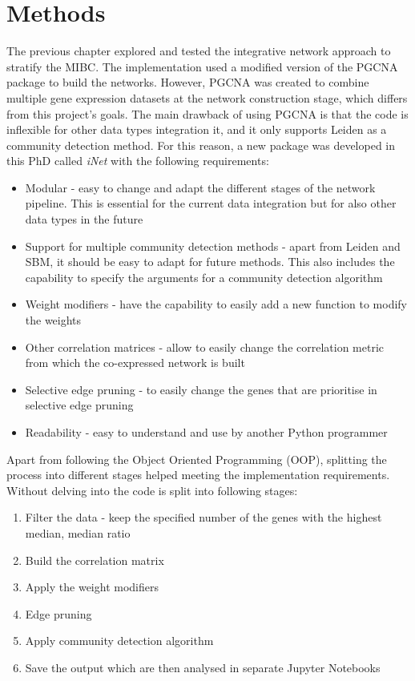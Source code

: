 \section{Methods} \label{s:N_II:methods}

The previous chapter explored and tested the integrative network approach to stratify the MIBC. The implementation used a modified version of the PGCNA package to build the networks. However, PGCNA was created to combine multiple gene expression datasets at the network construction stage, which differs from this project's goals. The main drawback of using PGCNA is that the code is inflexible for other data types integration it, and it only supports Leiden as a community detection method. For this reason, a new package was developed in this PhD called \textit{iNet} with the following requirements: 

\begin{itemize}
    \item Modular - easy to change and adapt the different stages of the network pipeline. This  is essential for the current data integration but for also other data types in the future
    \item Support for multiple community detection methods - apart from Leiden and SBM, it should be easy to adapt for future methods. This also includes the capability to specify the arguments for a community detection algorithm
    \item Weight modifiers - have the capability to easily add a new function to modify the weights
    \item Other correlation matrices - allow to easily change the correlation metric from which the co-expressed network is built
    \item Selective edge pruning - to easily change the genes that are prioritise in selective edge pruning 
    \item Readability - easy to understand and use by another Python programmer
\end{itemize}

Apart from following the Object Oriented Programming (OOP), splitting the process into different stages helped meeting the implementation requirements. Without delving into the code is split into following stages:
\begin{enumerate}
    \item Filter the data - keep the specified number of the genes with the highest median, median ratio
    \item Build the correlation matrix
    \item Apply the weight modifiers
    \item Edge pruning
    \item Apply community detection algorithm
    \item Save the output which are then analysed in separate Jupyter Notebooks
\end{enumerate}

